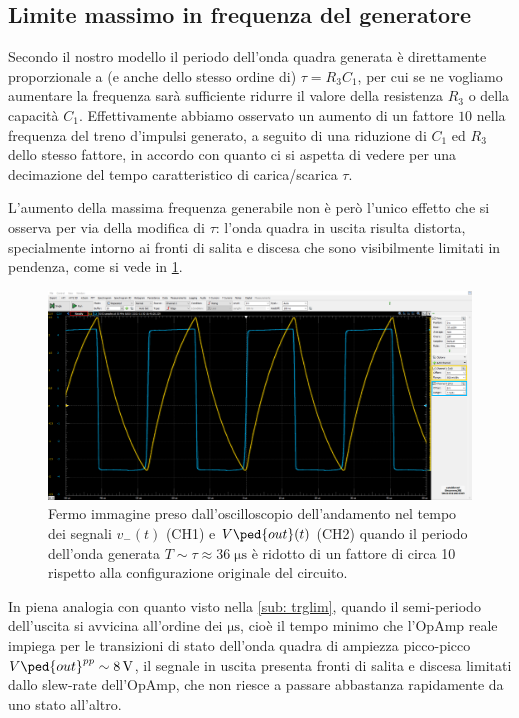 \documentclass[10pt, a4paper, italian]{article}
\begin{document}
\subsection{Limite massimo in frequenza del generatore}
Secondo il nostro modello il periodo dell'onda quadra generata è direttamente
proporzionale a (e anche dello stesso ordine di) $\tau = R_3 C_1$, per cui
se ne vogliamo aumentare la frequenza sarà sufficiente ridurre il valore
della resistenza $R_3$ o della capacità $C_1$. Effettivamente abbiamo osservato
un aumento di un fattore $10$ nella frequenza del treno d'impulsi generato,
a seguito di una riduzione di $C_1$ ed $R_3$ dello stesso fattore, in accordo
con quanto ci si aspetta di vedere per una decimazione del tempo caratteristico
di carica/scarica $\tau$.

L'aumento della massima frequenza generabile non è però l'unico effetto che
si osserva per via della modifica di $\tau$: l'onda quadra in uscita risulta
distorta, specialmente intorno ai fronti di salita e discesa che sono
visibilmente limitati in pendenza, come si vede in \cref{fig: astable1nF}.
\begin{figure}[htbp]
\centering
\includegraphics[scale=0.335]{astable1nF}
\caption{Fermo immagine preso dall'oscilloscopio dell'andamento nel tempo dei
segnali $v_- (t)$ (CH1) e $V\ped{out} (t)$ (CH2) quando il periodo dell'onda
generata $T \sim \tau \approx 36 \; \si{\micro\s}$ è ridotto di un fattore di
circa 10 rispetto alla configurazione originale del circuito.
\label{fig: astable1nF}}
\end{figure}

In piena analogia con quanto visto nella \cref{sub: trglim}, quando il
semi-periodo dell'uscita si avvicina all'ordine dei $\si{\micro\s}$, cioè il
tempo minimo che l'OpAmp reale impiega per le transizioni di stato dell'onda
quadra di ampiezza picco-picco $V\ped{out}^{pp} \sim \SI{8}{\V}$, il segnale
in uscita presenta fronti di salita e discesa limitati dallo slew-rate
dell'OpAmp, che non riesce a passare abbastanza rapidamente da uno stato
all'altro.
\end{document}
